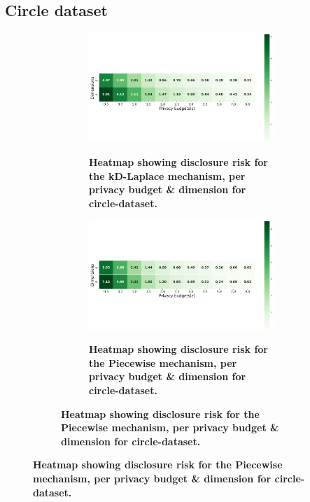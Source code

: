 \newpage
\subsection{Circle dataset} \label{appendix:results-privacy-circle-dataset}
\begin{figure}
    \centering
    \begin{subfigure}[b]{0.85\textwidth}
        \begin{subfigure}[c]{1\textwidth}
            \caption{\textbf{Heatmap showing disclosure risk for the kD-Laplace mechanism, per privacy budget \& dimension for circle-dataset.}}
            \includegraphics[width=1\textwidth]{Results/kd-laplace/kd-Laplace/circle-dataset/distance.png}
            \label{fig:privacy-risk_circle-dataset_adversial_advantage_kd-laplace}
        \end{subfigure}
        \vfill %

        \begin{subfigure}[c]{1\textwidth}
            \caption{\textbf{Heatmap showing disclosure risk for the Piecewise mechanism, per privacy budget \& dimension for circle-dataset.}}
            \includegraphics[width=1\textwidth]{Results/kd-laplace/piecewise/circle-dataset/distance.png}
            \label{fig:privacy-risk_circle-dataset_adversial_advantage_piecewise}
        \end{subfigure}
    \end{subfigure}
\end{figure}
\newpage
